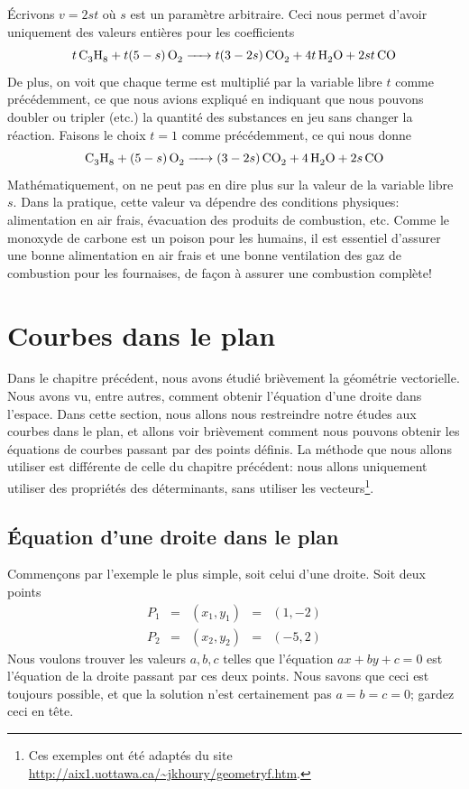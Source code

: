 Écrivons $v=2st$ où $s$ est un paramètre arbitraire.  Ceci nous permet d'avoir
uniquement des valeurs entières pour les coefficients
\[
\ce{$t\,$C3H8 + $t(5-s)\,$O2 -> $t(3-2s)\,$CO2 + $4t\,$H2O + $2st\,$CO}
\]
De plus, on voit que chaque terme est multiplié par la variable libre $t$ comme précédemment, ce
que nous avions expliqué en indiquant que nous pouvons doubler ou tripler (etc.) 
la quantité des substances en jeu sans changer la réaction.  Faisons le choix $t=1$ comme
précédemment, ce qui nous donne
\[
\ce{C3H8 + $(5-s)\,$O2 -> $(3-2s)\,$CO2 + $4\,$H2O + $2s\,$CO}
\]
Mathématiquement, on ne peut pas en dire plus sur la valeur de la variable libre $s$.
Dans la pratique, cette valeur va dépendre des conditions physiques: alimentation en
air frais, évacuation des produits de combustion, etc. Comme le monoxyde de carbone
est un poison pour les humains, il est essentiel d'assurer une bonne alimentation
en air frais et une bonne ventilation des gaz de combustion pour les fournaises,
de façon à assurer une combustion complète!

\section{Courbes dans le plan}

Dans le chapitre précédent, nous avons étudié brièvement la géométrie vectorielle.  
Nous avons vu, entre autres, comment obtenir l'équation d'une droite dans l'espace.
Dans cette section, nous allons nous restreindre notre études aux courbes dans
le plan, et allons voir brièvement comment nous pouvons obtenir les équations
de courbes passant par des points définis. La méthode que nous allons
utiliser est différente de celle du chapitre précédent: nous allons uniquement
utiliser des propriétés des déterminants, sans utiliser les vecteurs\footnote{Ces exemples
ont été adaptés du site \url{http://aix1.uottawa.ca/~jkhoury/geometryf.htm}.}.

\subsection{Équation d'une droite dans le plan}

Commençons par l'exemple le plus simple, soit celui d'une droite. Soit deux points
\[
\begin{matrix}
P_1 &=& (x_1, y_1) &=& (1, -2)\\
P_2 &=& (x_2, y_2) &=& (-5, 2)
\end{matrix}
\]
 Nous voulons trouver les valeurs $a, b, c$ telles
que l'équation $ax+by+c=0$ est l'équation de la droite passant par ces deux points.
Nous savons que ceci est toujours possible, et que la solution n'est certainement pas
$a=b=c=0$; gardez ceci en tête.

